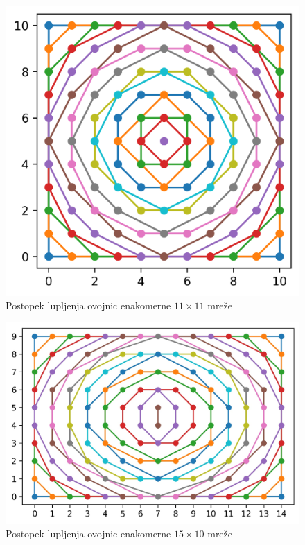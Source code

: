 \documentclass[a4paper]{article}
\begin{document}
\begin{figure}[!h]
	\centering
	\caption{Postopek lupljenja ovojnic enakomerne $11 \times 11$ mreže}
	\label{fig:11x11}
	\vspace{2mm}
	\includegraphics[scale=0.6]{slike/11x11_enakomerna.png}
\end{figure}

\begin{figure}[!h]
	\centering
	\caption{Postopek lupljenja ovojnic enakomerne $15 \times 10$ mreže}
	\label{fig:15x10}
	\vspace{2mm}
	\includegraphics[scale=0.6]{slike/15x10_enakomerna.jpg}
\end{figure}
\end{document}
